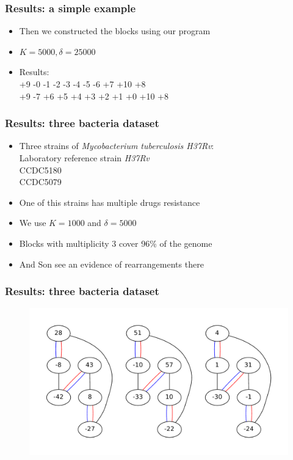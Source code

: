 \documentclass[svgnames,14pt]{beamer}
\begin{document}
\begin{frame}
\frametitle{Results: a simple example}
\begin{itemize}
\item Then we constructed the blocks using our program
\item \(K = 5000, \delta = 25000\)
\item Results: \\
+9 -0 -1 -2 -3 -4 -5 -6 +7 +10 +8 \\
+9 -7 +6 +5 +4 +3 +2 +1 +0 +10 +8 \\
\end{itemize}
\end{frame}

\begin{frame}
\frametitle{Results: three bacteria dataset}
\begin{itemize}
\item Three strains of \textit{Mycobacterium tuberculosis H37Rv}: \\
Laboratory reference strain \textit{H37Rv} \\
CCDC5180 \\
CCDC5079 \\
\item One of this strains has multiple drugs resistance
\item We use \(K = 1000\) and \(\delta = 5000\)
\item Blocks with multiplicity 3 cover 96\% of the genome
\item And Son see an evidence of rearrangements there
\end{itemize}
\end{frame}

\begin{frame}
\frametitle{Results: three bacteria dataset}
\begin{changemargin}{-1.cm}{-1.cm}
\begin{figure}
\centering
\includegraphics[scale = 0.50]{tuber.pdf}
\small \caption{}
\end{figure}
\end{changemargin}
\end{frame}
\end{document}
